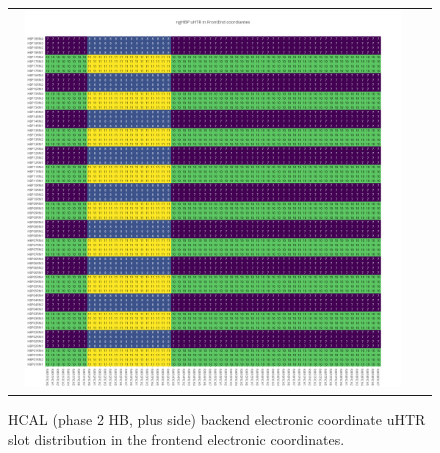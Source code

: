 \clearpage
\begin{figure}[htb]
 \begin{center}
  \begin{tabular}{cc}
   \includegraphics[angle=0,width=0.95\textwidth]{figures/appendix/ngHBP_uHTR_in_FrontEnd.png}
  \end{tabular}
  \caption{HCAL (phase 2 HB, plus side) backend electronic coordinate uHTR slot distribution in the frontend electronic coordinates.}
  \label{fig:lmapngHBPuHTRFEC}
 \end{center}
\end{figure}

